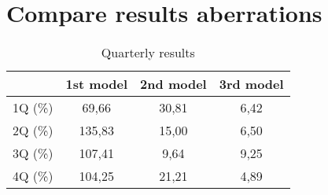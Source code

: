 \section{Compare results aberrations} \label{abbr}
\begin{table}[h!]
    \begin{center}
        \begin{tabular}{ | l | c | c | c |}
            \hline
            & \textbf{1st model} & \textbf{2nd model} & \textbf{3rd model}\\
            \hline
            1Q (\%) & 69,66 & 30,81 & 6,42\\
            2Q (\%) & 135,83 & 15,00 & 6,50\\
            3Q (\%) & 107,41 & 9,64 & 9,25\\
            4Q (\%) & 104,25 & 21,21 & 4,89\\
            \hline
        \end{tabular}
    \end{center}
    \caption{Quarterly results}
    \label{qResults}
\end{table}
\newpage
